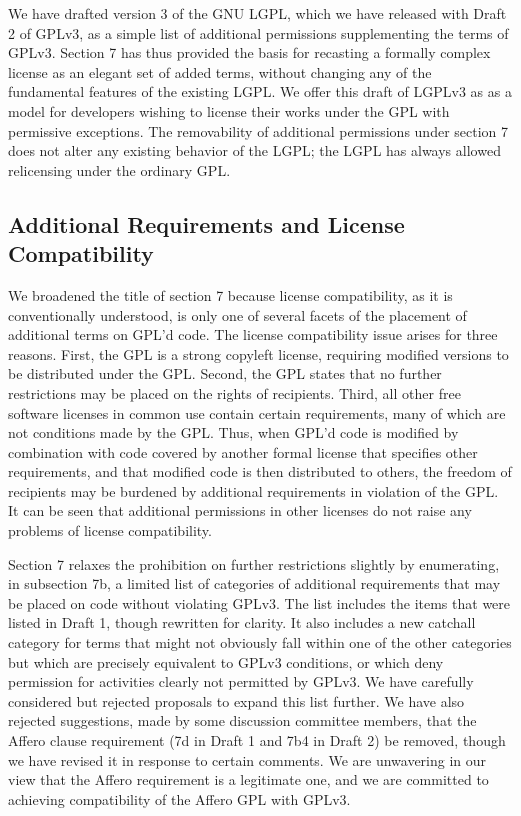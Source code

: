 
We have drafted version 3 of the GNU LGPL, which we have released with Draft
2 of GPLv3, as a simple list of additional permissions supplementing the
terms of GPLv3.  Section 7 has thus provided the basis for recasting a
formally complex license as an elegant set of added terms, without changing
any of the fundamental features of the existing LGPL.  We offer this draft of
LGPLv3 as as a model for developers wishing to license their works under the
GPL with permissive exceptions.  The removability of additional permissions
under section 7 does not alter any existing behavior of the LGPL; the LGPL
has always allowed relicensing under the ordinary GPL.

\subsection{Additional Requirements and License Compatibility}


We broadened the title of section 7 because license compatibility, as it is
conventionally understood, is only one of several facets of the placement of
additional terms on GPL'd code.  The license compatibility issue arises for
three reasons.  First, the GPL is a strong copyleft license, requiring
modified versions to be distributed under the GPL.  Second, the GPL states
that no further restrictions may be placed on the rights of recipients.
Third, all other free software licenses in common use contain certain
requirements, many of which are not conditions made by the GPL.  Thus, when
GPL'd code is modified by combination with code covered by another formal
license that specifies other requirements, and that modified code is then
distributed to others, the freedom of recipients may be burdened by
additional requirements in violation of the GPL.  It can be seen that
additional permissions in other licenses do not raise any problems of license
compatibility.


Section 7 relaxes the prohibition on further restrictions slightly by
enumerating, in subsection 7b, a limited list of categories of additional
requirements that may be placed on code without violating GPLv3.  The list
includes the items that were listed in Draft 1, though rewritten for clarity.
It also includes a new catchall category for terms that might not obviously
fall within one of the other categories but which are precisely equivalent to
GPLv3 conditions, or which deny permission for activities clearly not
permitted by GPLv3.  We have carefully considered but rejected proposals to
expand this list further.  We have also rejected suggestions, made by some
discussion committee members, that the Affero clause requirement (7d in Draft
1 and 7b4 in Draft 2) be removed, though we have revised it in response to
certain comments.  We are unwavering in our view that the Affero requirement
is a legitimate one, and we are committed to achieving compatibility of the
Affero GPL with GPLv3.

